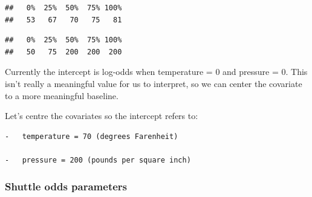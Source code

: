 \documentclass[
  openany]{book}
\newenvironment{Shaded}{\begin{snugshade}}{\end{snugshade}}
\newcommand{\AttributeTok}[1]{\textcolor[rgb]{0.77,0.63,0.00}{#1}}
\newcommand{\DecValTok}[1]{\textcolor[rgb]{0.00,0.00,0.81}{#1}}
\newcommand{\FunctionTok}[1]{\textcolor[rgb]{0.00,0.00,0.00}{#1}}
\newcommand{\NormalTok}[1]{#1}
\newcommand{\OtherTok}[1]{\textcolor[rgb]{0.56,0.35,0.01}{#1}}
\newcommand{\SpecialCharTok}[1]{\textcolor[rgb]{0.00,0.00,0.00}{#1}}
\newcommand{\StringTok}[1]{\textcolor[rgb]{0.31,0.60,0.02}{#1}}
\begin{document}
\begin{verbatim}
##   0%  25%  50%  75% 100% 
##   53   67   70   75   81
\end{verbatim}

\begin{Shaded}
\end{Shaded}

\begin{verbatim}
##   0%  25%  50%  75% 100% 
##   50   75  200  200  200
\end{verbatim}

Currently the intercept is log-odds when temperature = 0 and pressure = 0. This isn't really a meaningful value for us to interpret, so we can center the covariate to a more meaningful baseline.

Let's centre the covariates so the intercept refers to:

\begin{verbatim}
-   temperature = 70 (degrees Farenheit)

-   pressure = 200 (pounds per square inch)
\end{verbatim}

\begin{Shaded}
\end{Shaded}

\hypertarget{shuttle-odds-parameters}{%
\subsubsection{Shuttle odds parameters}\label{shuttle-odds-parameters}}
\end{document}
